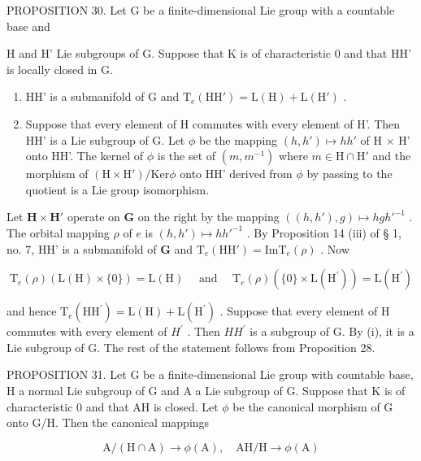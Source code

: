 PROPOSITION 30. Let G be a finite-dimensional Lie group with a countable base and

H and H' Lie subgroups of G. Suppose that K is of characteristic 0 and that HH' is locally closed in G.

\begin{enumerate}
\def\labelenumi{(\roman{enumi})}
\item
  HH' is a submanifold of G and \(\mathrm{T}_{e}(\mathrm{HH}') = \mathrm{L}(\mathrm{H}) + \mathrm{L}(\mathrm{H}')\) .
\item
  Suppose that every element of H commutes with every element of H'. Then HH' is a Lie subgroup of G. Let \(\phi\) be the mapping \((h, h') \mapsto hh'\) of H \(\times\) H' onto HH'. The kernel of \(\phi\) is the set of \((m, m^{-1})\) where \(m \in \mathrm{H} \cap \mathrm{H}'\) and the morphism of \((\mathrm{H} \times \mathrm{H}') / \mathrm{Ker} \phi\) onto HH' derived from \(\phi\) by passing to the quotient is a Lie group isomorphism.
\end{enumerate}

Let \(\mathbf{H} \times \mathbf{H}'\) operate on \(\mathbf{G}\) on the right by the mapping \(((h, h'), g) \mapsto hgh'^{-1}\) . The orbital mapping \(\rho\) of \(e\) is \((h, h') \mapsto hh'^{-1}\) . By Proposition 14 (iii) of § 1, no. 7, HH' is a submanifold of \(\mathbf{G}\) and \(\mathrm{T}_e(\mathrm{HH}') = \mathrm{Im} \mathrm{T}_e(\rho)\) . Now

\[
\mathrm{T} _ {e} (\rho) (\mathrm{L} (\mathrm{H}) \times \{0 \}) = \mathrm{L} (\mathrm{H}) \quad \text { and } \quad \mathrm{T} _ {e} (\rho) (\{0 \} \times \mathrm{L} (\mathrm{H} ^ {\prime})) = \mathrm{L} (\mathrm{H} ^ {\prime})
\]

and hence \(\mathrm{T}_{e}(\mathrm{HH}^{\prime})=\mathrm{L}(\mathrm{H})+\mathrm{L}(\mathrm{H}^{\prime})\) . Suppose that every element of H commutes with every element of \(H^{\prime}\) . Then \(HH^{\prime}\) is a subgroup of G. By (i), it is a Lie subgroup of G. The rest of the statement follows from Proposition 28.

PROPOSITION 31. Let G be a finite-dimensional Lie group with countable base, H a normal Lie subgroup of G and A a Lie subgroup of G. Suppose that K is of characteristic 0 and that AH is closed. Let \(\phi\) be the canonical morphism of G onto G/H. Then the canonical mappings

\[
\mathrm{A} / (\mathrm{H} \cap \mathrm{A}) \rightarrow \phi (\mathrm{A}), \quad \mathrm{AH} / \mathrm{H} \rightarrow \phi (\mathrm{A})
\]

